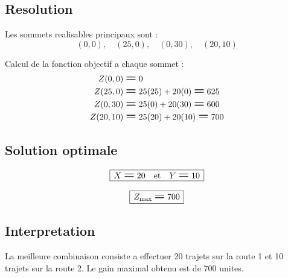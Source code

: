 \documentclass[12pt,a4paper]{article}
\newcommand{\Eq}{\mathrel{\text{\Large\bfseries =}}}
\newcommand{\BoxedEq}[1]{%
  \begin{equation*}
    \boxed{\,\displaystyle #1\,}
  \end{equation*}%
}
\begin{document}
\subsection*{Resolution}
Les sommets realisables principaux sont :
\[
(0,0), \quad (25,0), \quad (0,30), \quad (20,10)
\]

Calcul de la fonction objectif a chaque sommet :
\[
\begin{aligned}
Z(0,0)    &\Eq 0 \\
Z(25,0)   &\Eq 25(25) + 20(0)  \Eq 625 \\
Z(0,30)   &\Eq 25(0)  + 20(30) \Eq 600 \\
Z(20,10)  &\Eq 25(20) + 20(10) \Eq 700
\end{aligned}
\]

\subsection*{Solution optimale}

\BoxedEq{X \Eq 20 \quad\text{et}\quad Y \Eq 10}

\BoxedEq{Z_{\mathrm{max}} \Eq 700}

\subsection*{Interpretation}
La meilleure combinaison consiste a effectuer 20 trajets sur la route 1 et 10 trajets sur la route 2. Le gain maximal obtenu est de 700 unites.
\end{document}
